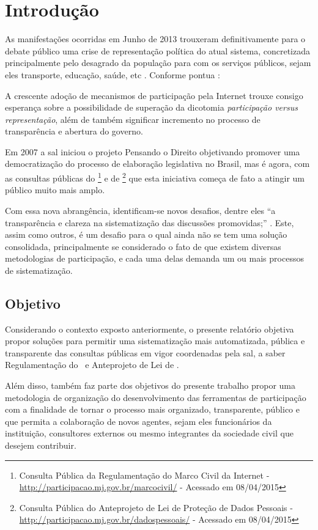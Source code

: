 \chapter{Introdução}
As manifestações ocorridas em Junho de 2013 trouxeram definitivamente para o debate público uma crise de representação política do atual sistema, concretizada principalmente pelo desagrado da população para com os serviços públicos, sejam eles transporte, educação, saúde, etc \cite{SANTANA2013}.
Conforme pontua :
\begin{citacao}
A crescente adoção de mecanismos de participação pela Internet trouxe consigo esperança sobre a possibilidade de superação da dicotomia \textit{participação versus representação}, além de também significar incremento no processo de transparência e abertura do governo.
\end{citacao}

Em 2007 a \gls{sal} iniciou o projeto Pensando o Direito objetivando promover uma democratização do processo de elaboração legislativa no Brasil, mas é agora, com as consultas públicas do \mc\footnote{Consulta Pública da Regulamentação do Marco Civil da Internet - \url{http://participacao.mj.gov.br/marcocivil/} - Acessado em 08/04/2015} e de \pdp\footnote{Consulta Pública do Anteprojeto de Lei de Proteção de Dados Pessoais - \url{http://participacao.mj.gov.br/dadospessoais/} - Acessado em 08/04/2015} que esta iniciativa começa de fato a atingir um público muito mais amplo.

Com essa nova abrangência, identificam-se novos desafios, dentre eles ``a transparência e clareza na sistematização das discussões promovidas;'' \cite{svab2014}. Este, assim como outros, é um desafio para o qual ainda não se tem uma solução consolidada, principalmente se considerado o fato de que existem diversas metodologias de participação, e cada uma delas demanda um ou mais processos de sistematização.

\section{Objetivo}
Considerando o contexto exposto anteriormente, o presente relatório objetiva propor soluções para permitir uma sistematização mais automatizada, pública e transparente das consultas públicas em vigor coordenadas pela \gls{sal}, a saber Regulamentação do \mc~e Anteprojeto de Lei de \pdp.

Além disso, também faz parte dos objetivos do presente trabalho propor uma metodologia de organização do desenvolvimento das ferramentas de participação com a finalidade de tornar o processo mais organizado, transparente, público e que permita a colaboração de novos agentes, sejam eles funcionários da instituição, consultores externos ou mesmo integrantes da sociedade civil que desejem contribuir.